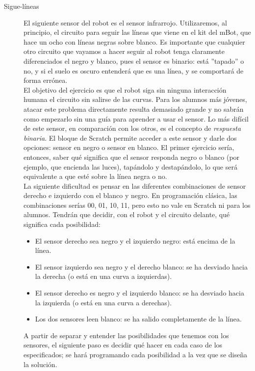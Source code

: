 \begin{description}
\item[Sigue-líneas]\label{ej:sigueLineas}
El siguiente sensor del robot es el sensor infrarrojo.
Utilizaremos, al principio, el circuito para seguir las líneas que viene en el kit del mBot, que hace un ocho con líneas negras sobre blanco. Es importante que cualquier otro circuito que vayamos a hacer seguir al robot tenga claramente diferenciados el negro y blanco, pues el sensor es binario: está ''tapado'' o no, y si el suelo es oscuro entenderá que es una línea, y se comportará de forma errónea.\\
El objetivo del ejercicio es que el robot siga sin ninguna interacción humana el circuito sin salirse de las curvas. Para los alumnos más jóvenes, atacar este problema directamente resulta demasiado grande y no sabrán como empezarlo sin una guía para aprender a usar el sensor. Lo más difícil de este sensor, en comparación con los otros, es el concepto de \textit{respuesta binaria}. El bloque de Scratch permite acceder a este sensor y darle dos opciones: sensor en negro o sensor en blanco. El primer ejercicio sería, entonces, saber qué significa que el sensor responda negro o blanco (por ejemplo, que encienda las luces), tapándolo y destapándolo, lo que será equivalente a que esté sobre la línea negra o no.\\
La siguiente dificultad es pensar en las diferentes combinaciones de sensor derecho e izquierdo con el blanco y negro. En programación clásica, las combinaciones serías 00, 01, 10, 11, pero esto no vale en Scratch ni para los alumnos. Tendrán que decidir, con el robot y el circuito delante, qué significa cada posibilidad:
\begin{itemize}
	\item El sensor derecho sea negro y el izquierdo negro: está encima de la línea.
	\item El sensor izquierdo sea negro y el derecho blanco: se ha desviado hacia la derecha (o está en una curva a izquierdas).
	\item El sensor derecho es negro y el izquierdo blanco: se ha desviado hacia la izquierda (o está en una curva a derechas).
	\item Los dos sensores leen blanco: se ha salido completamente de la línea.
\end{itemize}
A partir de separar y entender las posibilidades que tenemos con los sensores, el siguiente paso es decidir qué hacer en cada caso de los especificados; se hará programando cada posibilidad a la vez que se diseña la solución.
\begin{itemize}

\end{itemize}
\end{description}

